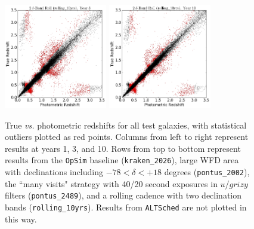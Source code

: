 \begin{figure}
\begin{center}
\includegraphics[width=4.5cm,trim={0cm 0cm 0cm 0cm},clip]{figures/tzpz_rolling10yrs_3.png}
\includegraphics[width=4.5cm,trim={0cm 0cm 0cm 0cm},clip]{figures/tzpz_rolling10yrs_10.png}
\caption{True {\it vs.} photometric redshifts for all test galaxies, with statistical outliers plotted as red points. Columns from left to right represent results at years 1, 3, and 10. Rows from top to bottom represent results from the {\tt OpSim} baseline ({\tt kraken\_2026}), large WFD area with declinations including  $-78<\delta<+18$ degrees ({\tt pontus\_2002}), the ``many visits" strategy with 40/20 second exposures in $u$/$grizy$ filters ({\tt pontus\_2489}), and a rolling cadence with two declination bands ({\tt rolling\_10yrs}). Results from {\tt ALTSched} are not plotted in this way. \label{fig:tzpz}}
\end{center}
\end{figure}


